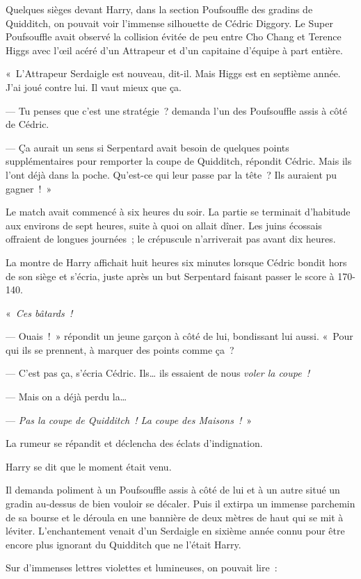 Quelques sièges devant Harry, dans la section Poufsouffle des gradins de Quidditch, on pouvait voir l'immense silhouette de Cédric Diggory.
Le Super Poufsouffle avait observé la collision évitée de peu entre Cho Chang et Terence Higgs avec l'œil acéré d'un Attrapeur et d'un capitaine d'équipe à part entière.

«~L'Attrapeur Serdaigle est nouveau, dit-il.
Mais Higgs est en septième année.
J'ai joué contre lui.
Il vaut mieux que ça.

--- Tu penses que c'est une stratégie~? demanda l'un des Poufsouffle assis à côté de Cédric.

--- Ça aurait un sens si Serpentard avait besoin de quelques points supplémentaires pour remporter la coupe de Quidditch, répondit Cédric.
Mais ils l'ont déjà dans la poche.
Qu'est-ce qui leur passe par la tête~?
Ils auraient pu gagner~!~»

Le match avait commencé à six heures du soir.
La partie se terminait d'habitude aux environs de sept heures, suite à quoi on allait dîner.
Les juins écossais offraient de longues journées~; le crépuscule n'arriverait pas avant dix heures.

La montre de Harry affichait huit heures six minutes lorsque Cédric bondit hors de son siège et s'écria, juste après un but Serpentard faisant passer le score à 170-140.

«~\emph{Ces bâtards~!}

--- Ouais~!~»
répondit un jeune garçon à côté de lui, bondissant lui aussi.
«~Pour qui ils se prennent, à marquer des points comme ça~?

--- C'est pas ça, s'écria Cédric.
Ils… ils essaient de nous \emph{voler la coupe~!}

--- Mais on a déjà perdu la…

--- \emph{Pas la coupe de Quidditch~!
La coupe des Maisons~!}~»

La rumeur se répandit et déclencha des éclats d'indignation.

Harry se dit que le moment était venu.

Il demanda poliment à un Poufsouffle assis à côté de lui et à un autre situé un gradin au-dessus de bien vouloir se décaler.
Puis il extirpa un immense parchemin de sa bourse et le déroula en une bannière de deux mètres de haut qui se mit à léviter.
L'enchantement venait d'un Serdaigle en sixième année connu pour être encore plus ignorant du Quidditch que ne l'était Harry.

Sur d'immenses lettres violettes et lumineuses, on pouvait lire~:

